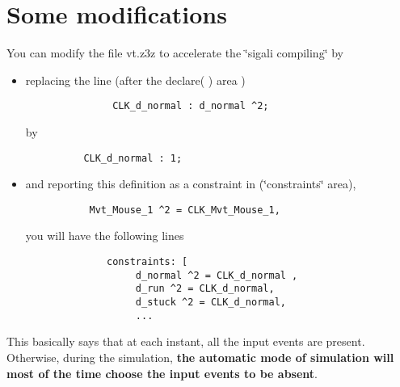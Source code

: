 \section{Some modifications}\label{note}
You can modify the file vt.z3z to accelerate the \char`\"{}sigali compiling\char`\"{} by\begin{itemize}
\item replacing the line (after the declare( ) area ) 

\footnotesize\begin{verbatim}               CLK_d_normal : d_normal ^2;
        \end{verbatim}
\normalsize
 by 

\footnotesize\begin{verbatim}	       CLK_d_normal : 1;
        \end{verbatim}
\normalsize
\end{itemize}


\begin{itemize}
\item and reporting this definition as a constraint in (\char`\"{}constraints\char`\"{} area), 

\footnotesize\begin{verbatim}	        Mvt_Mouse_1 ^2 = CLK_Mvt_Mouse_1,
        \end{verbatim}
\normalsize
 you will have the following lines 

\footnotesize\begin{verbatim}              constraints: [
                   d_normal ^2 = CLK_d_normal ,
                   d_run ^2 = CLK_d_normal,
                   d_stuck ^2 = CLK_d_normal,
                   ...
        \end{verbatim}
\normalsize
\end{itemize}


This basically says that at each instant, all the input events are present. Otherwise, during the simulation, {\bf  the automatic mode of simulation will most of the time choose the input events to be absent}. 